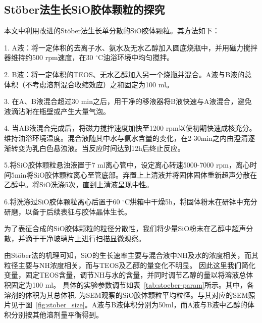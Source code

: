 \subsection{Stöber法生长SiO胶体颗粒的探究}

本文中利用改进的Stöber法生长单分散的SiO胶体颗粒。其方法如下：

1. A液：将一定体积的去离子水、氨水及无水乙醇加入圆底烧瓶中，并用磁力搅拌器维持约500 rpm速度，在30 $^{\circ}$C油浴环境中均匀搅拌。

2. B液：将一定体积的TEOS、无水乙醇加入另一个烧瓶并混合。A液与B液的总体积（不考虑溶剂混合收缩效应）之和固定为100 ml。

3. 在A、B液混合超过30 min之后，用干净的移液器将B液快速与A液混合，避免液滴沾附在瓶壁或产生大量气泡。

4. 当AB液混合完成后，将磁力搅拌速度加快至1200 rpm以使初期快速成核充分。维持油浴环境温度。混合液随其中水与氨水含量的变化，在2-30min之内由澄清逐渐转变为乳白色悬浊液。当反应时间达到12h后终止反应。

5.将SiO胶体颗粒悬浊液置于7 ml离心管中，设定离心转速5000-7000 rpm，离心时间5min将SiO胶体颗粒离心至管底部。弃置上上清液并将固体固体重新超声分散在乙醇中。将SiO洗涤5次，直到上清液呈现中性。

6.将洗涤过SiO胶体颗粒离心后置于60 $^{\circ}$C烘箱中干燥5h，将固体粉末在研钵中充分研磨，以备于后续表征与胶体晶体生长。

为了表征合成的SiO胶体颗粒的粒径分散性，我们将少量SiO粉末在乙醇中超声分散，并滴于干净玻璃片上进行扫描显微观察。

由Stöber法的机理\cite{Stoeber1968Controlled}可知，SiO的生长速率主要与混合液中NH及水的浓度相关，而其粒径主要与NH浓度相关，而与TEOS及乙醇的量变化不明显。
因此这里我们简化变量，固定TEOS含量，调节NH与水的含量，并同时调节乙醇的量以将溶液总体积固定为100 ml。
具体的实验参数调节如表~\ref{tab:stoeber-param}所示。其中，各溶剂的体积为其总体积, 为SEM观察的SiO胶体颗粒平均粒径。与其对应的SEM照片见于图~\ref{fig:stober_size}。A液与B液体积分别为50ml，而A液与B液中乙醇的体积分别按其他溶剂量平衡得到。

